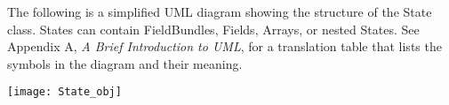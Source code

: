 

The following is a simplified UML diagram showing the structure of the
State class.  States can contain FieldBundles, Fields, Arrays, or nested
States.  See Appendix A, {\it A Brief Introduction to UML},
for a translation table that lists the symbols in the diagram and their 
meaning.

\begin{center}
\texttt{[image: State\_obj]}   
\end{center}
